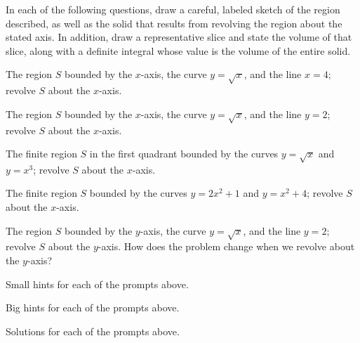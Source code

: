 \begin{activity} \label{A:6.1.1}  
In each of the following questions, draw a careful, labeled sketch of the region described, as well as the solid that results from revolving the region about the stated axis.  In addition, draw a representative slice and state the volume of that slice, along with a definite integral whose value is the volume of the entire solid.  
\ba
\item The region $S$ bounded by the $x$-axis, the curve $y = \sqrt{x}$, and the line $x = 4$; revolve $S$ about the $x$-axis.
\item The region $S$ bounded by the $x$-axis, the curve $y = \sqrt{x}$, and the line $y = 2$; revolve $S$ about the $x$-axis.
\item The finite region $S$ in the first quadrant bounded by the curves $y = \sqrt{x}$ and $y = x^3$; revolve $S$ about the $x$-axis.
\item The finite region $S$ bounded by the curves $y = 2x^2 + 1$ and $y  = x^2 + 4$; revolve $S$ about the $x$-axis.
\item The region $S$ bounded by the $y$-axis, the curve $y = \sqrt{x}$, and the line $y=2$; revolve $S$ about the $y$-axis.  How does the problem change when we revolve about the $y$-axis?
\ea

\end{activity}
\begin{smallhint}
\ba
	\item Small hints for each of the prompts above.
\ea
\end{smallhint}
\begin{bighint}
\ba
	\item Big hints for each of the prompts above.
\ea
\end{bighint}
\begin{activitySolution}
\ba
	\item Solutions for each of the prompts above.
\ea
\end{activitySolution}
\aftera
